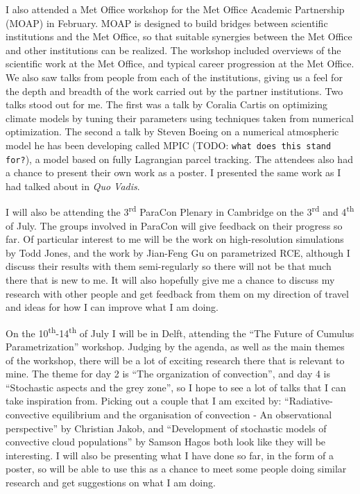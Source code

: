 \documentclass[11pt,a4paper]{article}
\newcommand{\ts}{\textsuperscript}
\newcommand{\todo}{TODO: \texttt}
\begin{document}
I also attended a Met Office workshop for the Met Office Academic Partnership (MOAP) in February. MOAP is designed to build bridges between scientific institutions and the Met Office, so that suitable synergies between the Met Office and other institutions can be realized. The workshop included overviews of the scientific work at the Met Office, and typical career progression at the Met Office. We also saw talks from people from each of the institutions, giving us a feel for the depth and breadth of the work carried out by the partner institutions. Two talks stood out for me. The first was a talk by Coralia Cartis on optimizing climate models by tuning their parameters using techniques taken from numerical optimization. The second a talk by Steven Boeing on a numerical atmospheric model he has been developing called MPIC (\todo{what does this stand for?}), a model based on fully Lagrangian parcel tracking. The attendees also had a chance to present their own work as a poster. I presented the same work as I had talked about in \textit{Quo Vadis}.

I will also be attending the 3\ts{rd} ParaCon Plenary in Cambridge on the 3\ts{rd} and 4\ts{th} of July. The groups involved in ParaCon will give feedback on their progress so far. Of particular interest to me will be the work on high-resolution simulations by Todd Jones, and the work by Jian-Feng Gu on parametrized RCE, although I discuss their results with them semi-regularly so there will not be that much there that is new to me. It will also hopefully give me a chance to discuss my research with other people and get feedback from them on my direction of travel and ideas for how I can improve what I am doing.

On the 10\ts{th}-14\ts{th} of July I will be in Delft, attending the ``The Future of Cumulus Parametrization'' workshop. Judging by the agenda, as well as the main themes of the workshop, there will be a lot of exciting research there that is relevant to mine. The theme for day 2 is ``The organization of convection'', and day 4 is ``Stochastic aspects and the grey zone'', so I hope to see a lot of talks that I can take inspiration from. Picking out a couple that I am excited by: ``Radiative-convective equilibrium and the organisation of convection - An observational perspective'' by Christian Jakob, and ``Development of stochastic models of convective cloud populations'' by Samson Hagos both look like they will be interesting. I will also be presenting what I have done so far, in the form of a poster, so will be able to use this as a chance to meet some people doing similar research and get suggestions on what I am doing.
\end{document}
